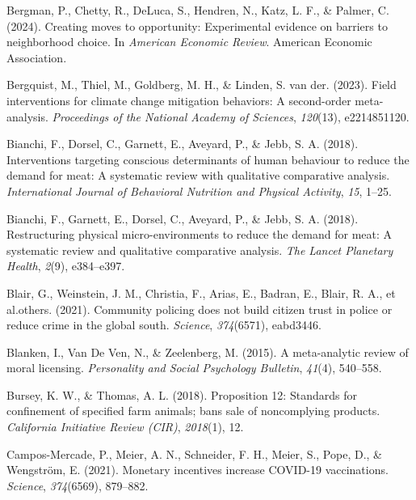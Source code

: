 \documentclass[
  man]{apa6}
\newlength{\cslhangindent}
\newenvironment{CSLReferences}[2] %
 {\begin{list}{}{%
  \setlength{\itemindent}{0pt}
  \setlength{\leftmargin}{0pt}
  \setlength{\parsep}{0pt}
  \ifodd #1
   \setlength{\leftmargin}{\cslhangindent}
   \setlength{\itemindent}{-1\cslhangindent}
  \fi
  \setlength{\itemsep}{#2\baselineskip}}}
 {\end{list}}
\begin{document}
\label{refs}
\begin{CSLReferences}{1}{0}
Bergman, P., Chetty, R., DeLuca, S., Hendren, N., Katz, L. F., \& Palmer, C. (2024). Creating moves to opportunity: Experimental evidence on barriers to neighborhood choice. In \emph{American Economic Review}. American Economic Association.

Bergquist, M., Thiel, M., Goldberg, M. H., \& Linden, S. van der. (2023). Field interventions for climate change mitigation behaviors: A second-order meta-analysis. \emph{Proceedings of the National Academy of Sciences}, \emph{120}(13), e2214851120.

Bianchi, F., Dorsel, C., Garnett, E., Aveyard, P., \& Jebb, S. A. (2018). Interventions targeting conscious determinants of human behaviour to reduce the demand for meat: A systematic review with qualitative comparative analysis. \emph{International Journal of Behavioral Nutrition and Physical Activity}, \emph{15}, 1--25.

Bianchi, F., Garnett, E., Dorsel, C., Aveyard, P., \& Jebb, S. A. (2018). Restructuring physical micro-environments to reduce the demand for meat: A systematic review and qualitative comparative analysis. \emph{The Lancet Planetary Health}, \emph{2}(9), e384--e397.

Blair, G., Weinstein, J. M., Christia, F., Arias, E., Badran, E., Blair, R. A., et al.others. (2021). Community policing does not build citizen trust in police or reduce crime in the global south. \emph{Science}, \emph{374}(6571), eabd3446.

Blanken, I., Van De Ven, N., \& Zeelenberg, M. (2015). A meta-analytic review of moral licensing. \emph{Personality and Social Psychology Bulletin}, \emph{41}(4), 540--558.

Bursey, K. W., \& Thomas, A. L. (2018). Proposition 12: Standards for confinement of specified farm animals; bans sale of noncomplying products. \emph{California Initiative Review (CIR)}, \emph{2018}(1), 12.

Campos-Mercade, P., Meier, A. N., Schneider, F. H., Meier, S., Pope, D., \& Wengström, E. (2021). Monetary incentives increase COVID-19 vaccinations. \emph{Science}, \emph{374}(6569), 879--882.


\end{CSLReferences}
\end{document}

